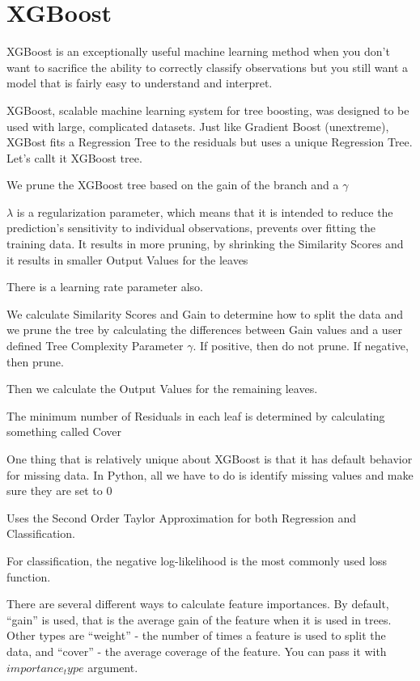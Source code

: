\section{XGBoost}

XGBoost is an exceptionally useful machine learning method when you don't want to sacrifice the ability to correctly classify observations but you still want a model that is fairly easy to understand and interpret. 


XGBoost, scalable machine learning system for tree boosting, was designed to be used with large, complicated datasets. Just like Gradient Boost (unextreme), XGBost fits a Regression Tree to the residuals but uses a unique Regression Tree. Let's callt it XGBoost tree.

We prune the XGBoost tree based on the gain of the branch and a $\gamma$

$\lambda$ is a regularization parameter, which means that it is intended to reduce the prediction's sensitivity to individual observations, prevents over fitting the training data. It results in more pruning, by shrinking the Similarity Scores and it results in smaller Output Values for the leaves

There is a learning rate parameter also.

We calculate Similarity Scores and Gain to determine how to split the data and we prune the tree by calculating the differences between Gain values and a user defined Tree Complexity Parameter $\gamma$. If positive, then do not prune. If negative, then prune.

Then we calculate the Output Values for the remaining leaves.

The minimum number of Residuals in each leaf is determined by calculating something called Cover

One thing that is relatively unique about XGBoost is that it has default behavior for missing data. In Python, all we have to do is identify missing values and make sure they are set to 0

Uses the Second Order Taylor Approximation for both Regression and Classification.

For classification, the negative log-likelihood is the most commonly used loss function.

There are several different ways to calculate feature importances. By default, “gain” is used, that is the average gain of the feature when it is used in trees. Other types are “weight” - the number of times a feature is used to split the data, and “cover” - the average coverage of the feature. You can pass it with $importance_type$ argument.

